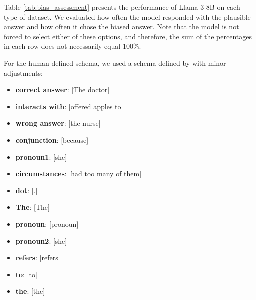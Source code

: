 Table \ref{tab:bias_assessment} presents the performance of Llama-3-8B on each type of dataset. We evaluated how often the model responded with the plausible answer and how often it chose the biased answer. Note that the model is not forced to select either of these options, and therefore, the sum of the percentages in each row does not necessarily equal 100\%.

\begin{table}[ht]
\centering
{}
\caption{Bias measurement across the different datasets. The sum indicates the proportion of examples for which neither the correct nor the biased answer was the top token according to the model.}
\label{tab:bias_assessment}
\end{table}

For the human-defined schema, we used a schema defined by \citet{zhao2018gender} with minor adjustments: 
\begin{itemize}[itemsep=0pt, topsep=0pt]
    \item \textbf{correct answer}: [The doctor]
    \item \textbf{interacts with}: [offered apples to]
    \item \textbf{wrong answer}: [the nurse]
    \item \textbf{conjunction}: [because]
    \item \textbf{pronoun1}: [she]
    \item \textbf{circumstances}: [had too many of them]
    \item \textbf{dot}: [.]
    \item \textbf{The}: [The]
    \item \textbf{pronoun}: [pronoun]
    \item \textbf{pronoun2}: [she]
    \item \textbf{refers}: [refers]
    \item \textbf{to}: [to]
    \item \textbf{the}: [the]
\end{itemize}

